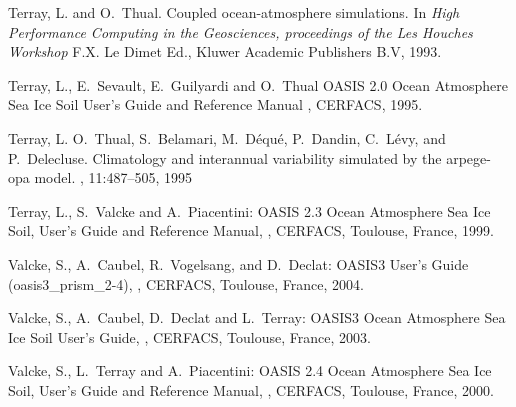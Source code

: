 \begin{thebibliography}{10}
Terray, L. and O.~Thual.
\newblock Coupled ocean-atmosphere simulations. 
\newblock In {\em High Performance Computing in the Geosciences,
proceedings of the Les Houches Workshop}
\newblock F.X. Le Dimet Ed., Kluwer Academic Publishers B.V, 1993.

Terray, L., E.~Sevault, E.~Guilyardi and O.~Thual
\newblock OASIS 2.0 Ocean Atmosphere Sea Ice Soil User's Guide and Reference Manual
, CERFACS, 1995.

Terray, L. O.~Thual, S.~Belamari, M.~D\'equ\'e, P.~Dandin, C.~L\'evy, and
P.~Delecluse. 
\newblock Climatology and interannual variability simulated by the arpege-opa
model. 
, 11:487--505, 1995

Terray, L., S.~Valcke and A.~Piacentini:
\newblock OASIS 2.3 Ocean Atmosphere Sea Ice Soil, User's Guide and
Reference Manual,
, 
\newblock CERFACS, Toulouse, France, 1999.

Valcke, S., A.~Caubel, R.~Vogelsang, and D.~Declat:       
\newblock OASIS3 User's Guide (oasis3\_prism\_2-4),
, 
\newblock CERFACS, Toulouse, France, 2004.

Valcke, S., A.~Caubel, D.~Declat and L.~Terray:        
\newblock OASIS3 Ocean Atmosphere Sea Ice Soil User's Guide,
, 
\newblock CERFACS, Toulouse, France, 2003.

Valcke, S., L.~Terray and A.~Piacentini:
\newblock OASIS 2.4 Ocean Atmosphere Sea Ice Soil, User's Guide and
Reference Manual,
, 
\newblock CERFACS, Toulouse, France, 2000.

\end{thebibliography}
